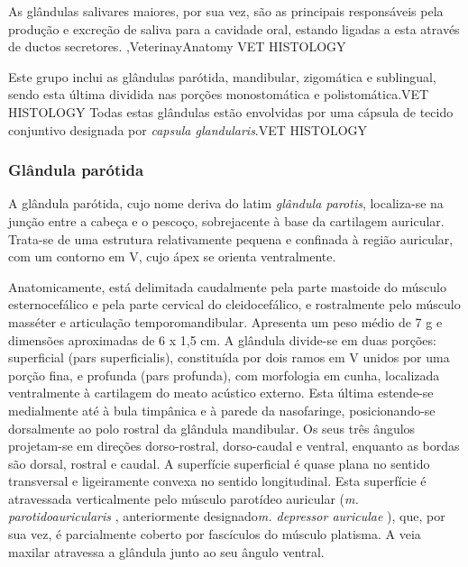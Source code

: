 As glândulas salivares maiores, por sua vez, são as principais responsáveis pela produção e excreção de saliva para a cavidade oral, estando ligadas a esta através de ductos secretores. \cite{dyce},VeterinayAnatomy VET HISTOLOGY 

Este grupo inclui as glândulas parótida, mandibular, zigomática e sublingual, sendo esta última dividida nas porções monostomática e polistomática.VET HISTOLOGY Todas estas glândulas estão envolvidas por uma cápsula de tecido conjuntivo designada por \textit{capsula glandularis}.VET HISTOLOGY

\subsubsection{Glândula parótida}

A glândula parótida, cujo nome deriva do latim \textit{glândula parotis}, localiza-se na junção entre a cabeça e o pescoço, sobrejacente  à base da cartilagem auricular. Trata-se de uma estrutura relativamente pequena e confinada à região auricular, com um contorno em V, cujo ápex se orienta ventralmente.\cite{dyce}

Anatomicamente, está delimitada caudalmente pela parte mastoide do músculo esternocefálico e pela parte cervical do cleidocefálico, e rostralmente pelo músculo masséter e articulação temporomandibular.\cite{dyce} Apresenta um peso médio de 7 g e dimensões aproximadas de 6 x 1,5 cm.\cite{dyce}
A glândula divide-se em duas porções: superficial (pars superficialis), constituída por dois ramos em V unidos por uma porção fina, e profunda (pars profunda), com morfologia em cunha, localizada ventralmente à cartilagem do meato acústico externo.\cite{dyce} Esta última estende-se medialmente até à bula timpânica e à parede da nasofaringe, posicionando-se dorsalmente ao polo rostral da glândula mandibular.\cite{dyce}
Os seus três ângulos projetam-se em direções dorso-rostral, dorso-caudal e ventral, enquanto as bordas são dorsal, rostral e caudal.\cite{dyce} A superfície superficial  é quase plana no sentido transversal e ligeiramente convexa no sentido longitudinal.\cite{dyce} Esta superfície é atravessada verticalmente pelo músculo parotídeo auricular (\textit{m. parotidoauricularis} , anteriormente designado\textit{m. depressor auriculae} ), que, por sua vez, é parcialmente coberto por fascículos do músculo platisma.\cite{dyce} A veia maxilar atravessa a glândula junto ao seu ângulo ventral.\cite{dyce}


